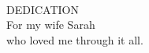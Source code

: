 \vspace{3in}
\begin{center}
~\\
\vspace{1in}
DEDICATION\\

For my wife Sarah\\
who loved me through it all.


\end{center}
